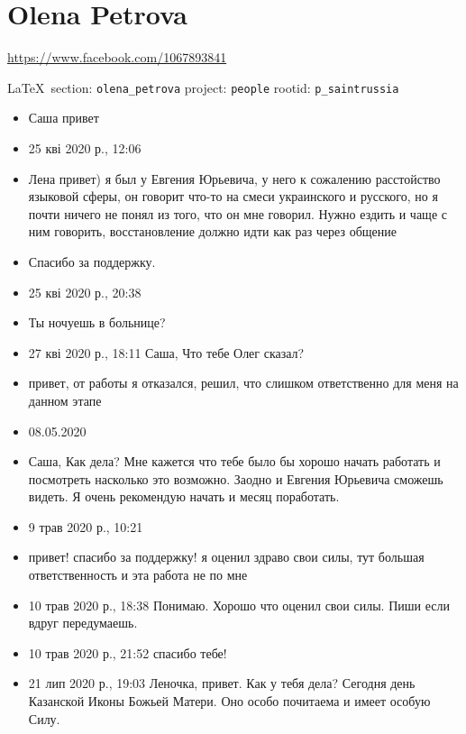  
 
\section{Olena Petrova}
\url{https://www.facebook.com/1067893841}
  
\vspace{0.5cm}
 {	\ifDEBUG		\small		\LaTeX~section: \verb|olena_petrova| project: \verb|people| rootid: \verb|p_saintrussia|		\fi}
\vspace{0.5cm}

\begin{itemize}
\item Саша привет
\item 25 кві 2020 р., 12:06
\item Лена привет) я был у Евгения Юрьевича, у него к сожалению расстойство
				языковой сферы, он говорит что-то на смеси украинского и русского, но я
				почти ничего не понял из того, что он мне говорил. Нужно ездить и чаще
				с ним говорить, восстановление должно идти как раз через общение
\item Спасибо за поддержку.
\item 25 кві 2020 р., 20:38
\item Ты ночуешь в больнице?
\item 27 кві 2020 р., 18:11
Саша, Что тебе Олег сказал?
\item привет, от работы я отказался, решил, что слишком ответственно для меня на данном этапе
\item 08.05.2020
\item Саша,
Как дела?  Мне кажется что тебе было бы хорошо начать работать и посмотреть
								насколько это возможно. Заодно и Евгения Юрьевича сможешь
								видеть. Я очень рекомендую начать и месяц поработать.
\item 9 трав 2020 р., 10:21
\item привет! спасибо за поддержку! я оценил здраво свои силы, тут большая ответственность и эта работа не по мне
\item 10 трав 2020 р., 18:38 Понимаю. Хорошо что оценил свои силы. Пиши если
				вдруг передумаешь.
\item 10 трав 2020 р., 21:52
спасибо тебе!
\item 21 лип 2020 р., 19:03 Леночка, привет. Как у тебя дела? Сегодня день
				Казанской Иконы Божьей Матери. Оно особо почитаема и имеет особую Силу.

\end{itemize}
